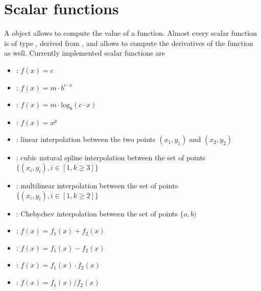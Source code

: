 %
%
%
%
%
% 
%
%

\section{Scalar functions}\label{sec:SCALARFUNCS}
A  object allows to compute the value of a function.
Almost every scalar function is of type ,
derived from , and allows to compute the derivatives of
the function as well. Currently implemented scalar functions are
\begin{itemize}
\item {}: $f(x)=c$
\item {}: $f(x)=m\cdot b^{c\cdot{x}}$
\item {}: $f(x)=m\cdot\textrm{log}_b(c\cdot{x})$
\item {}: $f(x)=x^p$
\item {}: linear interpolation between the two points $(x_1,y_1)$
and $(x_2,y_2)$
\item {}: cubic natural spline interpolation between the 
set of points $\{(x_i,y_i), i\in[1,k\geq3]\}$
\item {}: multilinear interpolation between the 
set of points $\{(x_i,y_i), i\in[1,k\geq2]\}$
\item {}: Chebychev interpolation between the 
set of points $\{a,b)$
\item {}: $f(x)=f_1(x) + f_2(x)$
\item {}: $f(x)=f_1(x) - f_2(x)$
\item {}: $f(x)=f_1(x) \cdot f_2(x)$
\item {}: $f(x)=f_1(x) / f_2(x)$
\end{itemize}

